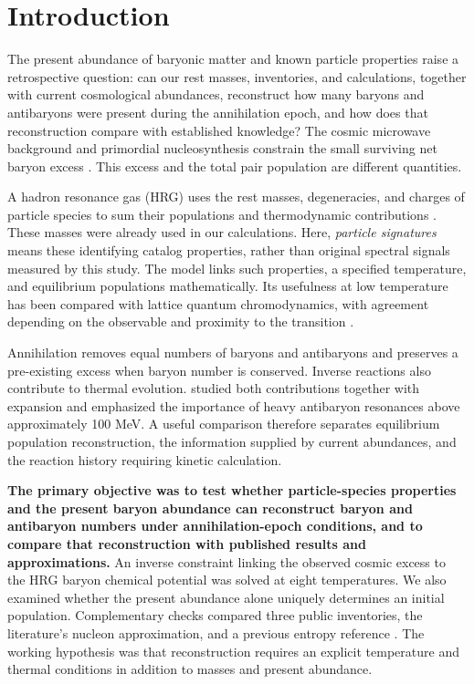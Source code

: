 \section{Introduction}
The present abundance of baryonic matter and known particle properties raise a retrospective question: can our rest masses, inventories, and calculations, together with current cosmological abundances, reconstruct how many baryons and antibaryons were present during the annihilation epoch, and how does that reconstruction compare with established knowledge? The cosmic microwave background and primordial nucleosynthesis constrain the small surviving net baryon excess \citep{Fields2025,Planck2020}. This excess and the total pair population are different quantities.

A hadron resonance gas (HRG) uses the rest masses, degeneracies, and charges of particle species to sum their populations and thermodynamic contributions \citep{Vovchenko2019}. These masses were already used in our calculations. Here, \emph{particle signatures} means these identifying catalog properties, rather than original spectral signals measured by this study. The model links such properties, a specified temperature, and equilibrium populations mathematically. Its usefulness at low temperature has been compared with lattice quantum chromodynamics, with agreement depending on the observable and proximity to the transition \citep{Bazavov2012}.

Annihilation removes equal numbers of baryons and antibaryons and preserves a pre-existing excess when baryon number is conserved. Inverse reactions also contribute to thermal evolution. \citet{Satarov2013} studied both contributions together with expansion and emphasized the importance of heavy antibaryon resonances above approximately 100 MeV. A useful comparison therefore separates equilibrium population reconstruction, the information supplied by current abundances, and the reaction history requiring kinetic calculation.

\textbf{The primary objective was to test whether particle-species properties and the present baryon abundance can reconstruct baryon and antibaryon numbers under annihilation-epoch conditions, and to compare that reconstruction with published results and approximations.} An inverse constraint linking the observed cosmic excess to the HRG baryon chemical potential was solved at eight temperatures. We also examined whether the present abundance alone uniquely determines an initial population. Complementary checks compared three public inventories, the literature's nucleon approximation, and a previous entropy reference \citep{Garcia2026}. The working hypothesis was that reconstruction requires an explicit temperature and thermal conditions in addition to masses and present abundance.
